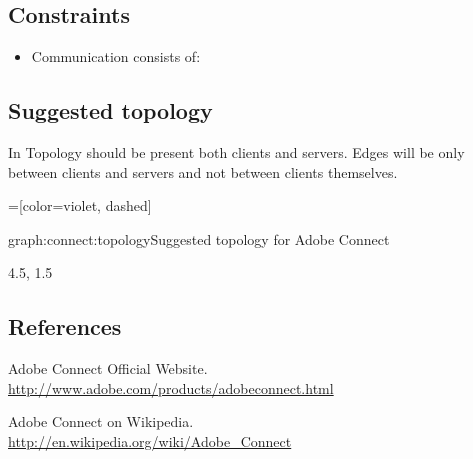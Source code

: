 \documentclass[a4paper]{report}
\begin{document}
\subsection{Constraints}

\begin{itemize}
\item Communication consists of:
\end{itemize}

\subsection{Suggested topology}

In Topology should be present both clients and servers. Edges will be only between clients and servers and not between clients themselves.

=[color=violet, dashed]

\begin{Graph}{graph:connect:topology}{Suggested topology for Adobe Connect}  

      
  
  \begin{GraphLegend}{4.5, 1.5}
  \end{GraphLegend}
\end{Graph}

\subsection{References}

\renewcommand{\bibsection}{}
\begin{thebibliography}{1}

Adobe Connect Official Website.
\\ \url{http://www.adobe.com/products/adobeconnect.html}

Adobe Connect on Wikipedia.
\\ \url{http://en.wikipedia.org/wiki/Adobe_Connect}

\end{thebibliography}
\end{document}
